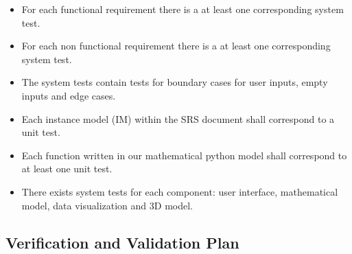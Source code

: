 \documentclass[12pt, titlepage]{article}
\begin{document}
\begin{itemize}
  \item For each functional requirement there is a at least one corresponding system test.
  \item For each non functional requirement there is a at least one corresponding system test.  
  \item The system tests contain tests for boundary cases for user inputs, empty inputs and edge cases. 
  \item Each instance model (IM) within the SRS document shall correspond to a unit test. 
  \item Each function written in our mathematical python model shall correspond to at least one unit test. 
  \item There exists system tests for each component: user interface, mathematical model, data visualization and 3D model. 
\end{itemize}
\subsection{Verification and Validation Plan}
\end{document}
